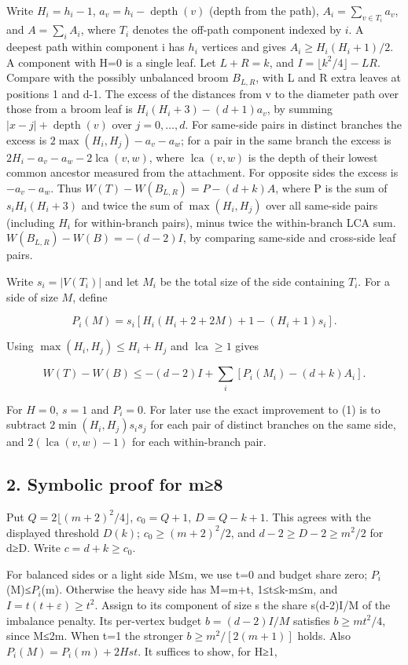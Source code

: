 \documentclass[
  10pt,
  a4paper,
]{article}
\begin{document}
Write \(H_i=h_i-1\), \(a_v=h_i-\operatorname{depth}(v)\) (depth from the
path), \(A_i=\sum_{v\in T_i}a_v\), and \(A=\sum_i A_i\), where \(T_i\)
denotes the off-path component indexed by \(i\). A deepest path within
component i has \(h_i\) vertices and gives \(A_i\ge H_i(H_i+1)/2\). A
component with H=0 is a single leaf. Let \(L+R=k\), and
\(I=\lfloor k^2/4\rfloor-LR\). Compare with the possibly unbalanced
broom \(B_{L,R}\), with L and R extra leaves at positions 1 and d-1. The
excess of the distances from v to the diameter path over those from a
broom leaf is \(H_i(H_i+3)-(d+1)a_v\), by summing
\(|x-j|+\operatorname{depth}(v)\) over \(j=0,\ldots,d\). For same-side
pairs in distinct branches the excess is \(2\max(H_i,H_j)-a_v-a_w\); for
a pair in the same branch the excess is
\(2H_i-a_v-a_w-2\operatorname{lca}(v,w)\), where
\(\operatorname{lca}(v,w)\) is the depth of their lowest common ancestor
measured from the attachment. For opposite sides the excess is
\(-a_v-a_w\). Thus \(W(T)-W(B_{L,R})=P-(d+k)A\), where P is the sum of
\(s_i H_i(H_i+3)\) and twice the sum of \(\max(H_i,H_j)\) over all
same-side pairs (including \(H_i\) for within-branch pairs), minus twice
the within-branch LCA sum. \(W(B_{L,R})-W(B)=-(d-2)I\), by comparing
same-side and cross-side leaf pairs.

Write \(s_i=|V(T_i)|\) and let \(M_i\) be the total size of the side
containing \(T_i\). For a side of size \(M\), define

\[P_i(M)=s_i[H_i(H_i+2+2M)+1-(H_i+1)s_i].\]

Using \(\max(H_i,H_j)\le H_i+H_j\) and \(\operatorname{lca}\ge1\) gives

\[W(T)-W(B)\le -(d-2)I+\sum_i[P_i(M_i)-(d+k)A_i].\tag{1}\]

For \(H=0\), \(s=1\) and \(P_i=0\). For later use the exact improvement
to (1) is to subtract \(2\min(H_i,H_j)s_i s_j\) for each pair of
distinct branches on the same side, and \(2(\operatorname{lca}(v,w)-1)\)
for each within-branch pair.

\subsection{2. Symbolic proof for m≥8}\label{symbolic-proof-for-m8}

Put \(Q=2\lfloor(m+2)^2/4\rfloor\), \(c_0=Q+1\), \(D=Q-k+1\). This
agrees with the displayed threshold \(D(k)\); \(c_0\ge(m+2)^2/2\), and
\(d-2\ge D-2\ge m^2/2\) for d≥D. Write \(c=d+k\ge c_0\).

For balanced sides or a light side M≤m, we use t=0 and budget share
zero; \(P_i\)(M)≤\(P_i\)(m). Otherwise the heavy side has M=m+t,
1≤t≤k-m≤m, and \(I=t(t+\varepsilon)\ge t^2\). Assign to its component of
size s the share s(d-2)I/M of the imbalance penalty. Its per-vertex
budget \(b=(d-2)I/M\) satisfies \(b\ge mt^2/4\), since M≤2m. When t=1
the stronger \(b\ge m^2/[2(m+1)]\) holds. Also \(P_i(M)=P_i(m)+2Hst\).
It suffices to show, for H≥1,
\end{document}
